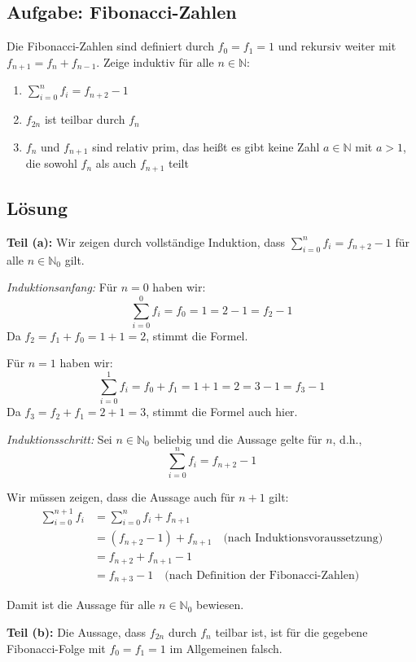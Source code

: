 \documentclass{article}
\begin{document}
\subsection*{Aufgabe: Fibonacci-Zahlen}
Die Fibonacci-Zahlen sind definiert durch $f_0 = f_1 = 1$ und rekursiv
weiter mit $f_{n+1} = f_n + f_{n-1}$. Zeige induktiv für alle $n \in \mathbb{N}$:
\begin{enumerate}
\item $\sum\limits_{i=0}^{n} f_i = f_{n+2} - 1$
\item $f_{2n}$ ist teilbar durch $f_n$
\item $f_n$ und $f_{n+1}$ sind relativ prim, das heißt es gibt keine Zahl
  $a \in \mathbb{N}$ mit $a > 1$, die sowohl $f_n$ als auch $f_{n+1}$ teilt
\end{enumerate}

\subsection*{Lösung}

\textbf{Teil (a):} Wir zeigen durch vollständige Induktion, dass $\sum\limits_{i=0}^{n} f_i = f_{n+2} - 1$ für alle $n \in \mathbb{N}_0$ gilt.

\textit{Induktionsanfang:}
Für $n = 0$ haben wir:
$$\sum_{i=0}^{0} f_i = f_0 = 1 = 2 - 1 = f_2 - 1$$
Da $f_2 = f_1 + f_0 = 1 + 1 = 2$, stimmt die Formel.

Für $n = 1$ haben wir:
$$\sum_{i=0}^{1} f_i = f_0 + f_1 = 1 + 1 = 2 = 3 - 1 = f_3 - 1$$
Da $f_3 = f_2 + f_1 = 2 + 1 = 3$, stimmt die Formel auch hier.

\textit{Induktionsschritt:}
Sei $n \in \mathbb{N}_0$ beliebig und die Aussage gelte für $n$, d.h., 
$$\sum_{i=0}^{n} f_i = f_{n+2} - 1$$

Wir müssen zeigen, dass die Aussage auch für $n+1$ gilt:
\begin{align}
\sum_{i=0}^{n+1} f_i &= \sum_{i=0}^{n} f_i + f_{n+1}\\
&= (f_{n+2} - 1) + f_{n+1} \quad \text{(nach Induktionsvoraussetzung)}\\
&= f_{n+2} + f_{n+1} - 1\\
&= f_{n+3} - 1 \quad \text{(nach Definition der Fibonacci-Zahlen)}
\end{align}

Damit ist die Aussage für alle $n \in \mathbb{N}_0$ bewiesen.

\vspace{0.5cm}

\textbf{Teil (b):} Die Aussage, dass $f_{2n}$ durch $f_n$ teilbar ist, ist für die gegebene Fibonacci-Folge mit $f_0 = f_1 = 1$ im Allgemeinen falsch.
\end{document}
